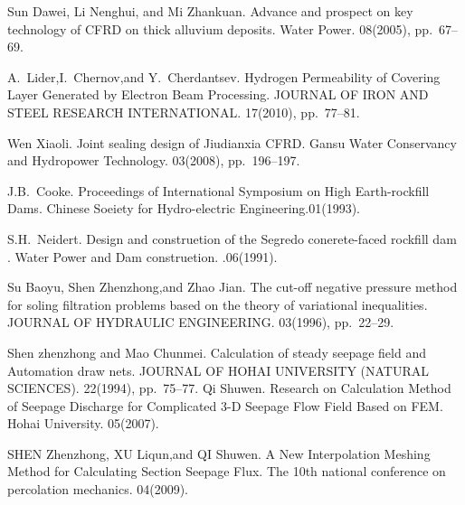
\begin{thebibliography}{10}
{\sc Sun Dawei, Li Nenghui, and Mi Zhankuan}. {Advance and prospect on key technology of CFRD on thick alluvium deposits}. Water Power. 08(2005), pp.~67--69.

{\sc A.~Lider,I.~Chernov,and Y.~Cherdantsev}. {Hydrogen Permeability of Covering Layer Generated by Electron Beam Processing}. JOURNAL OF IRON AND STEEL RESEARCH INTERNATIONAL. 17(2010), pp.~77--81.

{\sc Wen Xiaoli}. {Joint sealing design of Jiudianxia CFRD}. Gansu Water Conservancy and Hydropower Technology. 03(2008), pp.~196--197.

{\sc J.B.~Cooke}. {Proceedings of International Symposium on High Earth-rockfill Dams}. Chinese Soeiety for Hydro-electric Engineering.01(1993).

{\sc S.H.~Neidert}. {Design and construetion of the Segredo conerete-faced rockfill dam }. Water Power and Dam construetion. .06(1991).

{\sc Su Baoyu, Shen Zhenzhong,and Zhao Jian}. {The cut-off negative pressure method for soling filtration problems based on the theory of variational inequalities}. JOURNAL OF HYDRAULIC ENGINEERING. 03(1996), pp.~22--29.

{\sc Shen zhenzhong and Mao Chunmei}. {Calculation of steady seepage field and Automation draw nets}. JOURNAL OF HOHAI UNIVERSITY (NATURAL SCIENCES). 22(1994), pp.~75--77.
{\sc Qi Shuwen}. {Research on Calculation Method of Seepage Discharge for Complicated 3-D Seepage Flow Field Based on FEM}. Hohai University. 05(2007).

{\sc SHEN Zhenzhong, XU Liqun,and QI Shuwen}. {A New Interpolation Meshing Method for Calculating Section Seepage Flux}. The 10th national conference on percolation mechanics. 04(2009).
\end{thebibliography}